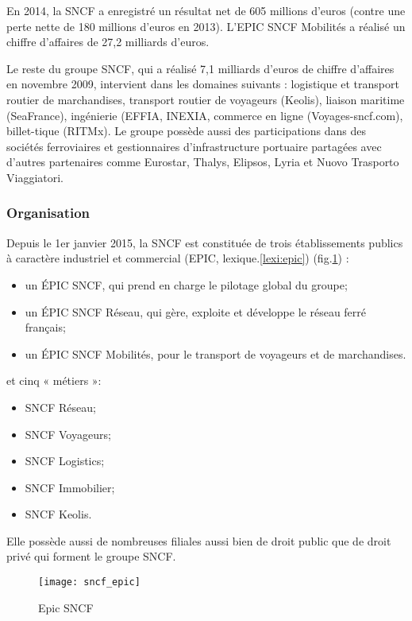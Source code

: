 En 2014, la SNCF a enregistré un résultat net de 605 millions d'euros (contre une perte nette de 180 millions d'euros en 2013). L'EPIC SNCF Mobilités a réalisé un chiffre d'affaires de 27,2 milliards d'euros.

Le reste du groupe SNCF, qui a réalisé 7,1 milliards d'euros de chiffre d'affaires en novembre 2009, intervient dans les domaines suivants : logistique et transport routier de marchandises, transport routier de voyageurs (Keolis), liaison maritime (SeaFrance), ingénierie (EFFIA, INEXIA, commerce en ligne (Voyages-sncf.com), billet-tique (RITMx). Le groupe possède aussi des participations dans des sociétés ferroviaires et gestionnaires d'infrastructure portuaire partagées avec d'autres partenaires comme Eurostar, Thalys, Elipsos, Lyria et Nuovo Trasporto Viaggiatori.

\subsubsection{Organisation}
Depuis le 1er janvier 2015,
la SNCF est constituée de trois établissements publics à caractère industriel et commercial (EPIC, lexique.\ref{lexi:epic}) (fig.\ref{fig:sncf_epic}) :

\begin{itemize}
 \item un ÉPIC SNCF, qui prend en charge le pilotage global du groupe;
 \item un ÉPIC SNCF Réseau, qui gère, exploite et développe le réseau ferré français;
 \item un ÉPIC SNCF Mobilités, pour le transport de voyageurs et de marchandises.
\end{itemize}
et cinq « métiers »:
\begin{itemize}
 \item SNCF Réseau;
 \item SNCF Voyageurs;
 \item SNCF Logistics;
 \item SNCF Immobilier;
 \item SNCF Keolis.
\end{itemize}

Elle possède aussi de nombreuses filiales aussi bien de droit public que de droit privé qui forment le groupe SNCF.

\begin{figure}[ht]
 \centering
 \texttt{[image: sncf\_epic]}
 \caption{Epic SNCF}
 \label{fig:sncf_epic}
\end{figure}

